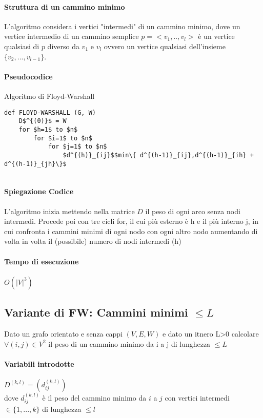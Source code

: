 \documentclass[12pt, a4paper, openany]{book}
\begin{document}
\paragraph*{Struttura di un cammino minimo}
L'algoritmo considera i vertici "intermedi" di un cammino minimo, dove un vertice intermedio di un cammino semplice $p=<v_1,..,v_l>$
è un vertice qualsiasi di $p$ diverso da $v_1$ e $v_l$ ovvero un vertice qualsiasi dell'insieme $\{v_2,...,v_{l-1}\}$.

\paragraph{Pseudocodice} Algoritmo di Floyd-Warshall

\begin{lstlisting}
def FLOYD-WARSHALL (G, W)
    D$^{(0)}$ = W
    for $h=1$ to $n$
        for $i=1$ to $n$
            for $j=1$ to $n$
                $d^{(h)}_{ij}$$min\{ d^{(h-1)}_{ij},d^{(h-1)}_{ih} + d^{(h-1)}_{jh}\}$


\end{lstlisting}

\paragraph{Spiegazione Codice}
L'algoritmo inizia mettendo nella matrice $D$ il peso di ogni arco senza nodi intermedi.
Procede poi con tre cicli for, il cui più esterno è h e il più interno j, in cui confronta i cammini minimi
di ogni nodo con ogni altro nodo aumentando di volta in volta il (possibile) numero di nodi intermedi (h)

\paragraph{Tempo di esecuzione}
\begin{center}
	$O(|V|^3)$
\end{center}

\subsection*{Variante di FW: Cammini minimi $\leq L$}

Dato un grafo orientato e senza cappi $(V,E,W)$ e dato un itnero L\textgreater0 calcolare
$\forall (i,j) \in V^2$ il peso di un cammino minimo da i a j di lunghezza $\leq L$

\paragraph{Variabili introdotte} $D^{(k,l)}= (d^{(k,l)}_{ij})$ \\
dove $d^{(k,l)}_{ij}$ è il peso del cammino minimo da $i$ a $j$
con vertici intermedi $\in \{1,...,k\}$ di lunghezza $\leq l$
\end{document}
